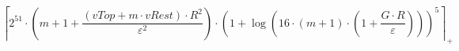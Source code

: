 \[\left\lceil 2^{51} \cdot \left(m + 1 + \frac{\left(vTop + m \cdot vRest\right) \cdot R^{2}}{\varepsilon^{2}}\right) \cdot \left(1 + \log\left(16 \cdot \left(m + 1\right) \cdot \left(1 + \frac{G \cdot R}{\varepsilon}\right)\right)\right)^{5} \right\rceil_{+}\]
